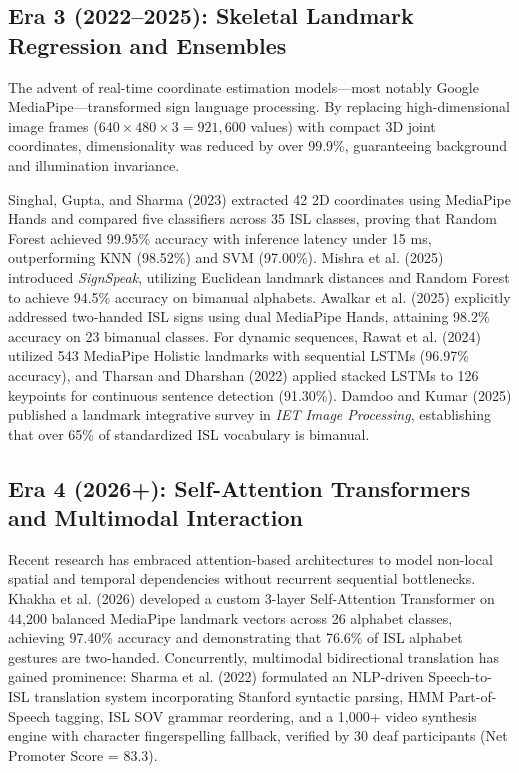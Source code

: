 \subsection{Era 3 (2022--2025): Skeletal Landmark Regression and Ensembles}
The advent of real-time coordinate estimation models—most notably Google MediaPipe—transformed sign language processing. By replacing high-dimensional image frames ($640 \times 480 \times 3 = 921,600$ values) with compact 3D joint coordinates, dimensionality was reduced by over 99.9\%, guaranteeing background and illumination invariance.

Singhal, Gupta, and Sharma (2023) \cite{singhal2023} extracted 42 2D coordinates using MediaPipe Hands and compared five classifiers across 35 ISL classes, proving that Random Forest achieved 99.95\% accuracy with inference latency under 15 ms, outperforming KNN (98.52\%) and SVM (97.00\%). Mishra et al. (2025) \cite{mishra2025} introduced \emph{SignSpeak}, utilizing Euclidean landmark distances and Random Forest to achieve 94.5\% accuracy on bimanual alphabets. Awalkar et al. (2025) \cite{awalkar2025} explicitly addressed two-handed ISL signs using dual MediaPipe Hands, attaining 98.2\% accuracy on 23 bimanual classes. For dynamic sequences, Rawat et al. (2024) \cite{rawat2024} utilized 543 MediaPipe Holistic landmarks with sequential LSTMs (96.97\% accuracy), and Tharsan and Dharshan (2022) \cite{tharsan2022} applied stacked LSTMs to 126 keypoints for continuous sentence detection (91.30\%). Damdoo and Kumar (2025) \cite{damdoo2025} published a landmark integrative survey in \emph{IET Image Processing}, establishing that over 65\% of standardized ISL vocabulary is bimanual.

\subsection{Era 4 (2026+): Self-Attention Transformers and Multimodal Interaction}
Recent research has embraced attention-based architectures to model non-local spatial and temporal dependencies without recurrent sequential bottlenecks. Khakha et al. (2026) \cite{khakha2026} developed a custom 3-layer Self-Attention Transformer on 44,200 balanced MediaPipe landmark vectors across 26 alphabet classes, achieving 97.40\% accuracy and demonstrating that 76.6\% of ISL alphabet gestures are two-handed. Concurrently, multimodal bidirectional translation has gained prominence: Sharma et al. (2022) \cite{sharma2022} formulated an NLP-driven Speech-to-ISL translation system incorporating Stanford syntactic parsing, HMM Part-of-Speech tagging, ISL SOV grammar reordering, and a 1,000+ video synthesis engine with character fingerspelling fallback, verified by 30 deaf participants (Net Promoter Score = 83.3).

